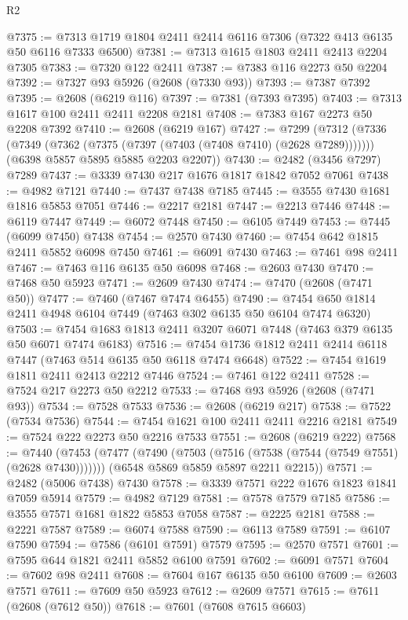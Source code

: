 \begin{lexlean}{R2}
\begin{coremodule}
@7375 := @7313 @1719 @1804 @2411 @2414 @6116 @7306 (@7322 @413 @6135 @50 @6116 @7333 @6500)
@7381 := @7313 @1615 @1803 @2411 @2413 @2204 @7305
@7383 := @7320 @122 @2411
@7387 := @7383 @116 @2273 @50 @2204
@7392 := @7327 @93 @5926 (@2608 (@7330 @93))
@7393 := @7387 @7392
@7395 := @2608 (@6219 @116)
@7397 := @7381 (@7393 @7395)
@7403 := @7313 @1617 @100 @2411 @2411 @2208 @2181
@7408 := @7383 @167 @2273 @50 @2208 @7392
@7410 := @2608 (@6219 @167)
@7427 := @7299
    (@7312
      (@7336 (@7349 (@7362 (@7375 (@7397 (@7403 (@7408 @7410) (@2628 @7289)))))))
      (@6398 @5857 @5895 @5885 @2203 @2207))
@7430 := @2482 (@3456 @7297) @7289
@7437 := @3339 @7430 @217 @1676 @1817 @1842 @7052 @7061
@7438 := @4982 @7121
@7440 := @7437 @7438 @7185
@7445 := @3555 @7430 @1681 @1816 @5853 @7051
@7446 := @2217 @2181
@7447 := @2213 @7446
@7448 := @6119 @7447
@7449 := @6072 @7448
@7450 := @6105 @7449
@7453 := @7445 (@6099 @7450) @7438
@7454 := @2570 @7430
@7460 := @7454 @642 @1815 @2411 @5852 @6098 @7450
@7461 := @6091 @7430
@7463 := @7461 @98 @2411
@7467 := @7463 @116 @6135 @50 @6098
@7468 := @2603 @7430
@7470 := @7468 @50 @5923
@7471 := @2609 @7430
@7474 := @7470 (@2608 (@7471 @50))
@7477 := @7460 (@7467 @7474 @6455)
@7490 := @7454 @650 @1814 @2411 @4948 @6104 @7449 (@7463 @302 @6135 @50 @6104 @7474 @6320)
@7503 := @7454 @1683 @1813 @2411 @3207 @6071 @7448 (@7463 @379 @6135 @50 @6071 @7474 @6183)
@7516 := @7454 @1736 @1812 @2411 @2414 @6118 @7447 (@7463 @514 @6135 @50 @6118 @7474 @6648)
@7522 := @7454 @1619 @1811 @2411 @2413 @2212 @7446
@7524 := @7461 @122 @2411
@7528 := @7524 @217 @2273 @50 @2212
@7533 := @7468 @93 @5926 (@2608 (@7471 @93))
@7534 := @7528 @7533
@7536 := @2608 (@6219 @217)
@7538 := @7522 (@7534 @7536)
@7544 := @7454 @1621 @100 @2411 @2411 @2216 @2181
@7549 := @7524 @222 @2273 @50 @2216 @7533
@7551 := @2608 (@6219 @222)
@7568 := @7440
    (@7453
      (@7477 (@7490 (@7503 (@7516 (@7538 (@7544 (@7549 @7551) (@2628 @7430)))))))
      (@6548 @5869 @5859 @5897 @2211 @2215))
@7571 := @2482 (@5006 @7438) @7430
@7578 := @3339 @7571 @222 @1676 @1823 @1841 @7059 @5914
@7579 := @4982 @7129
@7581 := @7578 @7579 @7185
@7586 := @3555 @7571 @1681 @1822 @5853 @7058
@7587 := @2225 @2181
@7588 := @2221 @7587
@7589 := @6074 @7588
@7590 := @6113 @7589
@7591 := @6107 @7590
@7594 := @7586 (@6101 @7591) @7579
@7595 := @2570 @7571
@7601 := @7595 @644 @1821 @2411 @5852 @6100 @7591
@7602 := @6091 @7571
@7604 := @7602 @98 @2411
@7608 := @7604 @167 @6135 @50 @6100
@7609 := @2603 @7571
@7611 := @7609 @50 @5923
@7612 := @2609 @7571
@7615 := @7611 (@2608 (@7612 @50))
@7618 := @7601 (@7608 @7615 @6603)

\end{coremodule}
\end{lexlean}
